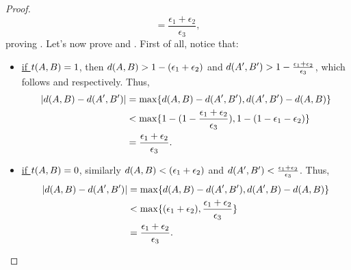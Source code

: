 \begin{lemma}
\begin{proof}
\[                    = \frac{\epsilon_1 + \epsilon_2}{\epsilon_3},
                \]
                proving .
                Let's now prove  and .
                First of all, notice that:
                \begin{itemize}
                    \item \underline{if $t( A,B ) = 1$}, then $d( A,B ) > 1 - ( \epsilon_1 + \epsilon_2 )$
                        and $d ( A',B' ) > 1 - \frac{\epsilon_1 + \epsilon_2}{\epsilon_3}$, which follows
                         and
                         respectively.
                        Thus,
                        \begin{align*}
                            | d ( A,B ) - d ( A',B' ) |
                                & = \max \{ d ( A,B ) - d ( A',B' ), d ( A',B' ) - d ( A,B ) \} \\
                                & < \max \{  1 - ( 1 - \frac{\epsilon_1 + \epsilon_2}{\epsilon_3} ),
                                    1 - ( 1 - \epsilon_1 - \epsilon_2 ) \} \\
                                & = \frac{\epsilon_1 + \epsilon_2}{\epsilon_3}.
                        \end{align*}
                    \item \underline{if $t( A,B ) = 0$}, similarly $d( A,B ) < ( \epsilon_1 + \epsilon_2 )$
                        and $d ( A',B' ) < \frac{\epsilon_1 + \epsilon_2}{\epsilon_3}$.
                        Thus,
                        \begin{align*}
                            | d ( A,B ) - d ( A',B' ) |
                                & = \max \{ d ( A,B ) - d ( A',B' ), d ( A',B ) - d ( A,B ) \} \\
                                & < \max \{ ( \epsilon_1 + \epsilon_2 ), \frac{\epsilon_1 + \epsilon_2}{\epsilon_3} \} \\
                                & = \frac{\epsilon_1 + \epsilon_2}{\epsilon_3}.
                        \end{align*}
                \end{itemize}

\end{proof}
\end{lemma}
